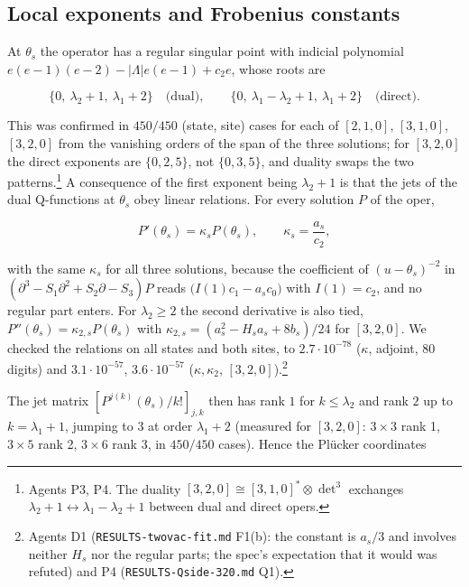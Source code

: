 \documentclass[11pt]{article}
\begin{document}
\subsection{Local exponents and Frobenius constants}\label{sec:frob}

At $\theta_s$ the operator has a regular singular point with indicial polynomial $e(e-1)(e-2)-|\Lambda|e(e-1)+c_2e$, whose roots are

\begin{equation}
\{0,\ \lambda_2+1,\ \lambda_1+2\}\quad\text{(dual)},\qquad\{0,\ \lambda_1-\lambda_2+1,\ \lambda_1+2\}\quad\text{(direct)}.\label{eq:exponents}
\end{equation}

This was confirmed in $450/450$ (state, site) cases for each of $[2,1,0]$, $[3,1,0]$, $[3,2,0]$ from the vanishing orders of the span of the three solutions; for $[3,2,0]$ the direct exponents are $\{0,2,5\}$, not $\{0,3,5\}$, and duality swaps the two patterns.\footnote{Agents P3, P4.
The duality $[3,2,0]\cong[3,1,0]^*\otimes\det^3$ exchanges $\lambda_2+1\leftrightarrow\lambda_1-\lambda_2+1$ between dual and direct opers.} A consequence of the first exponent being $\lambda_2+1$ is that the jets of the dual Q-functions at $\theta_s$ obey linear relations.
For every solution $P$ of the oper,

\begin{equation}
P'(\theta_s)=\kappa_sP(\theta_s),\qquad \kappa_s=\frac{a_s}{c_2},\label{eq:kappa}
\end{equation}

with the same $\kappa_s$ for all three solutions, because the coefficient of $(u-\theta_s)^{-2}$ in $(\partial^3-S_1\partial^2+S_2\partial-S_3)P$ reads $\bigl(I(1)c_1-a_sc_0\bigr)$ with $I(1)=c_2$, and no regular part enters.
For $\lambda_2\ge2$ the second derivative is also tied, $P''(\theta_s)=\kappa_{2,s}P(\theta_s)$ with $\kappa_{2,s}=(a_s^2-H_sa_s+8b_s)/24$ for $[3,2,0]$. We checked the relations on all states and both sites, to $2.7\cdot10^{-78}$ ($\kappa$, adjoint, 80 digits) and $3.1\cdot10^{-57}$, $3.6\cdot10^{-57}$ ($\kappa,\kappa_2$, $[3,2,0]$).\footnote{Agents D1 (\texttt{RESULTS-\allowbreak{}twovac-\allowbreak{}fit.\allowbreak{}md} F1(b): the constant is $a_s/3$ and involves neither $H_s$ nor the regular parts; the spec's expectation that it would was refuted) and P4 (\texttt{RESULTS-\allowbreak{}Qside-\allowbreak{}320.\allowbreak{}md} Q1).}

The jet matrix $[P^{j(k)}(\theta_s)/k!]_{j,k}$ then has rank $1$ for $k\le\lambda_2$ and rank $2$ up to $k=\lambda_1+1$, jumping to $3$ at order $\lambda_1+2$ (measured for $[3,2,0]$: $3\times3$ rank 1, $3\times5$ rank 2, $3\times6$ rank 3, in $450/450$ cases).
Hence the Plücker coordinates
\end{document}
